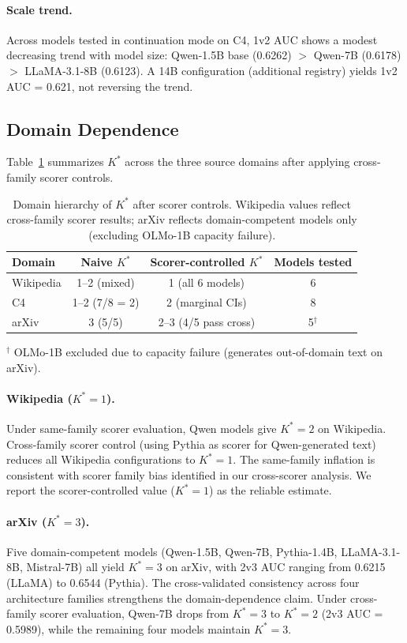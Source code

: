 \documentclass[11pt,a4paper]{article}
\begin{document}
\paragraph{Scale trend.}
Across models tested in continuation mode on C4, 1v2 AUC shows a modest decreasing trend with model size: Qwen-1.5B base (0.6262) $>$ Qwen-7B (0.6178) $>$ LLaMA-3.1-8B (0.6123). A 14B configuration (additional registry) yields 1v2 AUC = 0.621, not reversing the trend.

\subsection{Domain Dependence}
\label{sec:domain}

Table~\ref{tab:domain} summarizes $K^*$ across the three source domains after applying cross-family scorer controls.

\begin{table}[t]
\centering
\caption{Domain hierarchy of $K^*$ after scorer controls. Wikipedia values reflect cross-family scorer results; arXiv reflects domain-competent models only (excluding OLMo-1B capacity failure).}
\label{tab:domain}
\small
\begin{tabular}{lccc}
\toprule
Domain & Naive $K^*$ & Scorer-controlled $K^*$ & Models tested \\
\midrule
Wikipedia & 1--2 (mixed) & 1 (all 6 models) & 6 \\
C4 & 1--2 (7/8 = 2) & 2 (marginal CIs) & 8 \\
arXiv & 3 (5/5) & 2--3 (4/5 pass cross) & 5$^\dagger$ \\
\bottomrule
\end{tabular}
\vspace{2pt}
{\footnotesize $^\dagger$ OLMo-1B excluded due to capacity failure (generates out-of-domain text on arXiv).}
\end{table}

\paragraph{Wikipedia ($K^*=1$).}
Under same-family scorer evaluation, Qwen models give $K^*=2$ on Wikipedia. Cross-family scorer control (using Pythia as scorer for Qwen-generated text) reduces all Wikipedia configurations to $K^*=1$. The same-family inflation is consistent with scorer family bias identified in our cross-scorer analysis. We report the scorer-controlled value ($K^*=1$) as the reliable estimate.

\paragraph{arXiv ($K^*=3$).}
Five domain-competent models (Qwen-1.5B, Qwen-7B, Pythia-1.4B, LLaMA-3.1-8B, Mistral-7B) all yield $K^*=3$ on arXiv, with 2v3 AUC ranging from 0.6215 (LLaMA) to 0.6544 (Pythia). The cross-validated consistency across four architecture families strengthens the domain-dependence claim. Under cross-family scorer evaluation, Qwen-7B drops from $K^*=3$ to $K^*=2$ (2v3 AUC = 0.5989), while the remaining four models maintain $K^*=3$.
\end{document}
